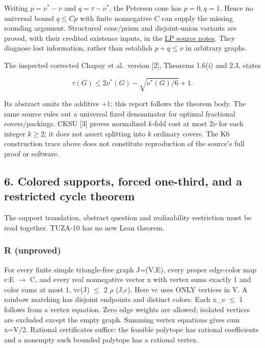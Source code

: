 \documentclass[11pt]{article}
\begin{document}
Writing \(p=\nu^*-\nu\) and \(q=\tau-\nu^*\), the Petersen cone has \(p=0,q=1\). Hence no universal bound \(q\le Cp\) with finite nonnegative \(C\) can supply the missing rounding argument. Structured cone/prism and disjoint-union variants are proved, with their credited existence inputs, in the \href{https://github.com/pappa211/ai-math-experiments/blob/main/problems/TUZA-09/notes/LP_GEOMETRY.md}{LP source notes}. They diagnose lost information, rather than establish \(p+q\le\nu\) in arbitrary graphs.

The inspected corrected Chapuy et al.~version {[}2{]}, Theorems 1.6(i) and 2.3, states

\[\tau(G)\le2\nu^*(G)-\sqrt{\nu^*(G)/6}+1.\]

Its abstract omits the additive \(+1\); this report follows the theorem body. The same source rules out a universal fixed denominator for optimal fractional covers/packings. CKSU {[}3{]} proves normalized \(k\)-fold cost at most \(2\nu\) for each integer \(k\ge2\); it does not assert splitting into \(k\) ordinary covers. The K6 construction trace above does not constitute reproduction of the source's full proof or software.

\subsection{6. Colored supports, forced one-third, and a restricted cycle theorem}\label{colored-supports-forced-one-third-and-a-restricted-cycle-theorem}

The support translation, abstract question and realizability restriction must be read together. TUZA-10 has no new Lean theorem.

\subsubsection{R (unproved)}\label{r-unproved}

For every finite simple triangle-free graph J=(V,E), every proper edge-color map c:E \(\to\) C, and every real nonnegative vector x with vertex sums exactly 1 and color sums at most 1, vc(J) \(\le\) 2 \(\rho\) (J,c). Here vc uses ONLY vertices in V. A rainbow matching has disjoint endpoints and distinct colors. Each x\_e \(\le\) 1 follows from a vertex equation. Zero edge weights are allowed; isolated vertices are excluded except the empty graph. Summing vertex equations gives sum x=\textbar V\textbar/2. Rational certificates suffice: the feasible polytope has rational coefficients and a nonempty such bounded polytope has a rational vertex.
\end{document}
